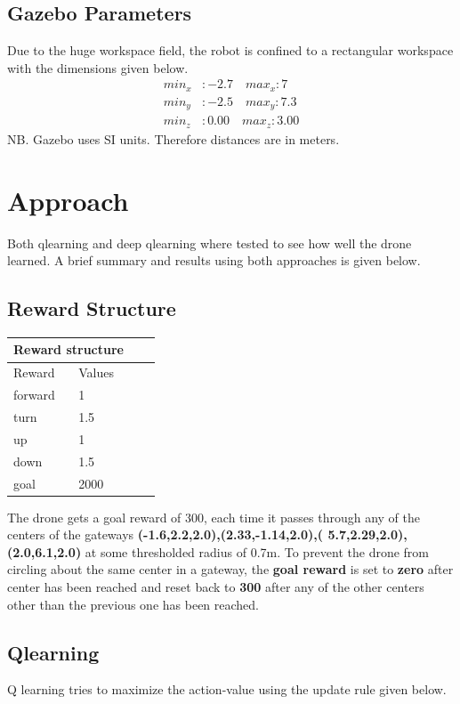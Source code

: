 \documentclass[12pt]{article}
\begin{document}
\subsection{Gazebo Parameters}
Due to the huge workspace field, the robot is confined to a rectangular workspace with the dimensions given below.
\begin{align}
  min_x&: -2.7  \quad \nonumber
max_x: 7 \\                     
  min_y&: -2.5  \quad  \nonumber
max_y: 7.3 \\                   
  min_z&: 0.00  \quad \nonumber
max_z: 3.00
\end{align}
NB. Gazebo uses SI units. Therefore distances are in meters.


\section{Approach}
Both qlearning and deep qlearning where tested to see how well the drone learned. A brief summary and results using both approaches 
is given below.
\subsection{Reward Structure}
\begin{table}[h]
  \centering
\begin{tabular}{ |p{3cm}||p{3cm}|p{3cm}|p{3cm}|  }
 \hline
 \multicolumn{2}{|c|}{Reward structure} \\
 \hline
 Reward     & Values\\
 \hline
 forward   & 1\\
 turn&   1.5\\
 up&1\\
 down&1.5\\
 goal& 2000  \\
 \hline
\end{tabular}
\end{table}

The drone gets a goal reward of 300, each time it passes through any of the centers of the gateways 
\textbf{(-1.6,2.2,2.0),(2.33,-1.14,2.0),( 5.7,2.29,2.0),(2.0,6.1,2.0)} at some thresholded radius of 0.7m. 
To prevent the drone from circling about the same 
center in a gateway, the \textbf{goal reward} is set to \textbf{zero} after center has been reached and reset back to \textbf{300} after any of the other centers other than the previous one has been reached.

\subsection{Qlearning}
 Q learning tries to maximize the action-value  using the update rule given below.
\end{document}
